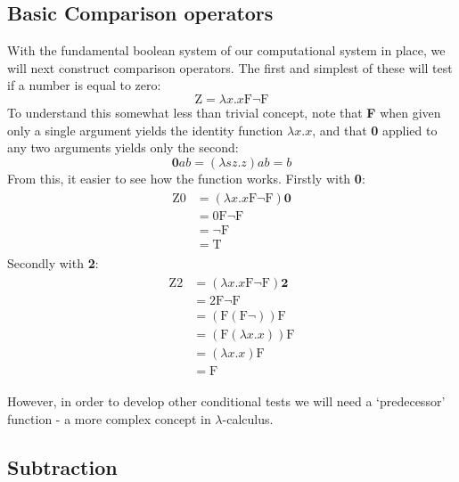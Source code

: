 \documentclass[Master.tex]{subfiles}
\begin{document}
\subsection{Basic Comparison operators}

With the fundamental boolean system of our computational system in place, we will next construct comparison operators. The first and simplest of these will test if a number is equal to zero:
\cite{rojas2015lambdatutorial}
\begin{equation*}
\bm{\mathrm{Z}} = \lambda x.x\bm{\mathrm{F\lnot F}}
\end{equation*}
To understand this somewhat less than trivial concept, note that \textbf{F} when given only a single argument yields the identity function $\lambda x.x$, and that \textbf{0} applied to any two arguments yields only the second:
\cite{rojas2015lambdatutorial}
\begin{equation*}
\bm{0}ab = (\lambda sz.z)ab = b
\end{equation*}
From this, it easier to see how the function works. Firstly with \textbf{0}:
\cite{rojas2015lambdatutorial}
\begin{gather*}
\begin{aligned}
\bm{\mathrm{Z0}} &= (\lambda x.x\bm{\mathrm{F\lnot F}})\bm{0}\\
&= \bm{\mathrm{0F\lnot F}}\\
&= \bm{\mathrm{\lnot F}}\\
&= \bm{\mathrm{T}}
\end{aligned}
\end{gather*}
Secondly with \textbf{2}:
\begin{gather*}
\begin{aligned}
\bm{\mathrm{Z2}} &= (\lambda x.x\bm{\mathrm{F\lnot F}})\bm{2}\\
&= \bm{\mathrm{2F\lnot F}}\\
&= (\bm{\mathrm{F}}(\bm{\mathrm{F}}\lnot)) \bm{\mathrm{F}}\\
&= (\bm{\mathrm{F}}(\lambda x.x))\bm{\mathrm{F}}\\
&= (\lambda x.x)\bm{\mathrm{F}}\\
&= \bm{\mathrm{F}} 
\end{aligned}
\end{gather*}

However, in order to develop other conditional tests we will need a `predecessor' function - a more complex concept in $\lambda$-calculus.
\subsection{Subtraction}
\end{document}

